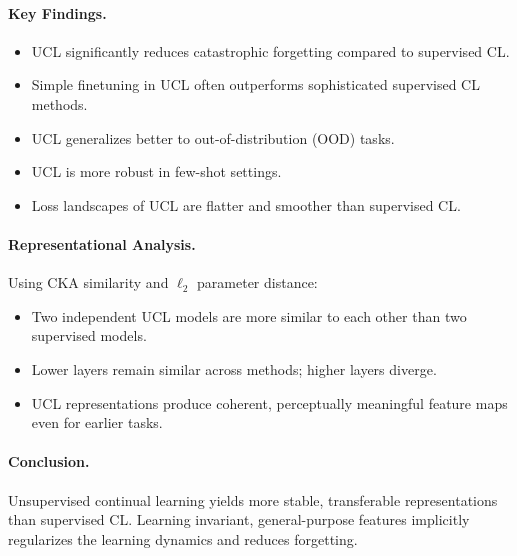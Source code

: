 \documentclass[12pt]{article}
\begin{document}
\paragraph{Key Findings.}
\begin{itemize}
		\item UCL significantly reduces catastrophic forgetting compared to supervised CL.
		\item Simple finetuning in UCL often outperforms sophisticated supervised CL methods.
		\item UCL generalizes better to out-of-distribution (OOD) tasks.
		\item UCL is more robust in few-shot settings.
		\item Loss landscapes of UCL are flatter and smoother than supervised CL.
\end{itemize}

\paragraph{Representational Analysis.}
Using CKA similarity and $\ell_2$ parameter distance:
\begin{itemize}
		\item Two independent UCL models are more similar to each other than two supervised models.
		\item Lower layers remain similar across methods; higher layers diverge.
		\item UCL representations produce coherent, perceptually meaningful feature maps even for earlier tasks.
\end{itemize}

\paragraph{Conclusion.}
Unsupervised continual learning yields more stable, transferable representations than supervised CL. Learning
invariant, general-purpose features implicitly regularizes the learning dynamics and reduces forgetting.
\end{document}

